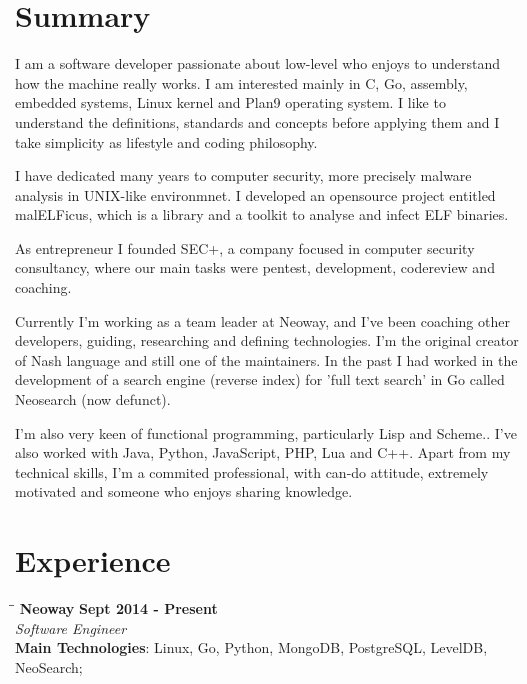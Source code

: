 \documentclass[margin]{res}
\begin{document}

\address{Florianopolis, SC, Brazil\\ tiago4orion@gmail.com \\ Phone: +55 4891051337 \\ Post Code: 88064-612 }


\begin{resume}

\section{Summary}  I am a software developer passionate about low-level who enjoys to understand how the machine really works. I am interested mainly in C, Go, assembly, embedded systems, Linux kernel and Plan9 operating system. I like to understand the definitions, standards and concepts before applying them and I take simplicity as lifestyle and coding philosophy.

I have dedicated many years to computer security, more precisely malware analysis in UNIX-like environmnet. I developed an opensource project entitled malELFicus, which is a library and a toolkit to analyse and infect ELF binaries.

As entrepreneur I founded SEC+, a company focused in computer security consultancy, where our main tasks were pentest, development, codereview and coaching.

Currently I'm working as a team leader at Neoway, and I've been
coaching other developers, guiding, researching and defining
technologies. I'm the original creator of Nash language and still one
of the maintainers. In the past I had worked in the development of a
search engine (reverse index) for 'full text search' in Go called Neosearch (now defunct).

I'm also  very keen of functional programming, particularly Lisp and Scheme.. I've also worked with Java, Python, JavaScript, PHP, Lua and C++. Apart from my technical skills, I'm a commited professional, with can-do attitude, extremely motivated and someone who enjoys sharing knowledge.

\section{Experience}

\vspace{-0.1in}
   \begin{tabbing}
   \hspace{2.3in}\= \hspace{1.7in}\= \kill %
    \textbf{Neoway}    \>\>\textbf{Sept 2014 - Present}\\
    \textit{Software Engineer}\\
    \textbf{Main Technologies}: Linux, Go, Python, MongoDB, PostgreSQL, LevelDB, NeoSearch;
   \end{tabbing}\vspace{-20pt}      %
    \vspace{2mm}


\end{resume}
\end{document}
